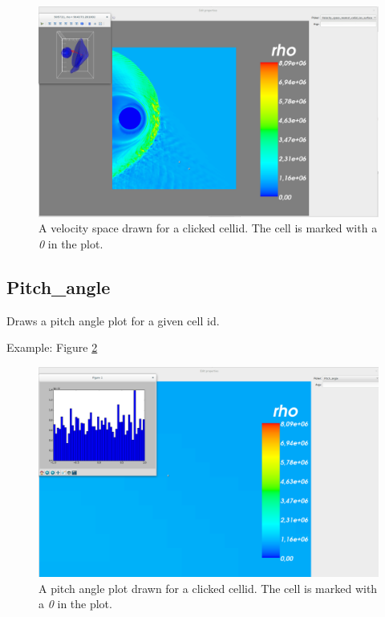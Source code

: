 \documentclass[a4paper,10pt]{article}
\begin{document}
\begin{figure}[H]
 \centering
 \includegraphics[width=\textwidth]{images/velocity_space_nearest_cellid_iso_surface.png}
 \caption{A velocity space drawn for a clicked cellid. The cell is marked with a \emph{0} in the plot.}
 \label{fig:vel_space2}
\end{figure}

\subsection{Pitch\_angle}

Draws a pitch angle plot for a given cell id.

Example: Figure \ref{fig:pitch_angle}

\begin{figure}[H]
 \centering
 \includegraphics[width=\textwidth]{images/pitch_angle.png}
 \caption{A pitch angle plot drawn for a clicked cellid. The cell is marked with a \emph{0} in the plot.}
 \label{fig:pitch_angle}
\end{figure}
\end{document}
